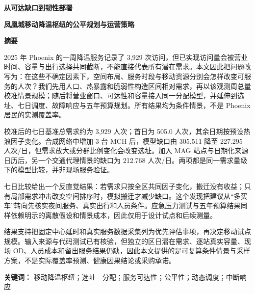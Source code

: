 \documentclass[12pt]{article}
\newenvironment{summary}{}{\clearpage}
\begin{document}
\begin{summary}
\begin{center}
    {\fontsize{24}{28}\selectfont\bfseries 从可达缺口到韧性部署\par}
    \vspace{0.25em}
    {\Large\bfseries 凤凰城移动降温枢纽的公平规划与运营策略\par}
    \vspace{0.8em}
    {\normalsize\bfseries 摘要\par}
\end{center}
\vspace{0.35em}

2025 年 Phoenix 的一周降温服务记录了 3,929 次访问，但已实现访问量会被营业时间、容量与出行选择共同截断，不能直接代表所有潜在需求。本文因此把问题改写为：在这些不确定因素下，空间布局、服务时段与移动资源分别会怎样改变可服务的人次？我们先用人口、热暴露和脆弱性构造区间相对需求，再以该观测周总量校准情景规模；随后将营业窗口、可达性和容量接入同一分配模型，并延伸到选址、七日调度、故障响应与五年预算规划。所有结果均为条件情景，不是 Phoenix 居民的实测覆盖率。

校准后的七日基准总需求约为 3,929 人次；首日为 505.0 人次，其余日期按预设热浪因子变化。合成网络中增加 3 台 MCH 后，模型缺口由 305.511 降至 227.295 人次/日，但需求放大或分群比例变化会改变选址。加入 MAG 站点与日期化来源日历后，另一个交通代理情景的缺口为 212.768 人次/日。两项都是同一需求量级下的模型比较，并非现场服务验证。

七日比较给出一个反直觉结果：若需求只按全区共同因子变化，搬迁没有收益；只有局部需求冲击改变空间排序时，模拟搬迁才减少缺口。这个发现把建议从“多买车”转向先核实夜间服务、真实出行和人员条件。应急压力测试与五年预算结果同样依赖明示的离散假设和情景成本，因此仅用于设计试点和后续测量。

结果支持把固定中心延时和真实服务数据采集列为优先评估事项，再决定移动试点规模。输入来源与代码测试已有核验，但独立的区日潜在需求、逐站真实容量、现场 OD、人员成本和留出服务结果仍缺，因此本文提供的是可复算条件情景与采样方案，不是实际覆盖率预测、健康因果结论或采购承诺。

\vspace{\baselineskip}
\noindent\textbf{关键词：} 移动降温枢纽；选址—分配；服务可达性；公平性；动态调度；中断响应
\end{summary}

\clearpage
\renewcommand{\contentsname}{目录}
\setcounter{tocdepth}{2}
\begingroup
\titleformat{\section}{\centering\Large\bfseries\color{black}}{}{0pt}{}
\tableofcontents
\endgroup
\end{document}
